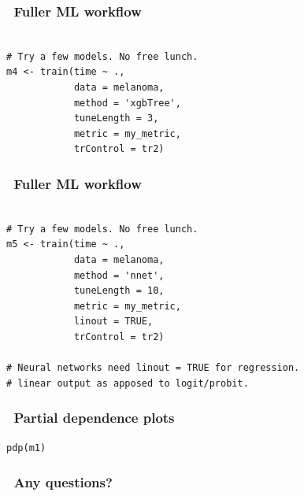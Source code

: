 \documentclass[handout, aspectratio = 169]{beamer}
\begin{document}
\begin{frame}[fragile]
\frametitle{\insertframenumber~Fuller ML workflow}
\begin{Verbatim}

# Try a few models. No free lunch.
m4 <- train(time ~ ., 
            data = melanoma,
            method = 'xgbTree',
            tuneLength = 3,
            metric = my_metric,
            trControl = tr2)

\end{Verbatim}

\end{frame} 


\begin{frame}[fragile]
\frametitle{\insertframenumber~Fuller ML workflow}
\begin{Verbatim}

# Try a few models. No free lunch.
m5 <- train(time ~ ., 
            data = melanoma,
            method = 'nnet',
            tuneLength = 10,
            metric = my_metric,
            linout = TRUE,
            trControl = tr2)

# Neural networks need linout = TRUE for regression.
# linear output as apposed to logit/probit.

\end{Verbatim}

\end{frame} 



\begin{frame}[fragile]
\frametitle{\insertframenumber~Partial dependence plots}
\begin{Verbatim}
pdp(m1)
\end{Verbatim}

\end{frame} 




\begin{frame}
\frametitle{\insertframenumber~Any questions?}


\end{frame} 
\end{document}
